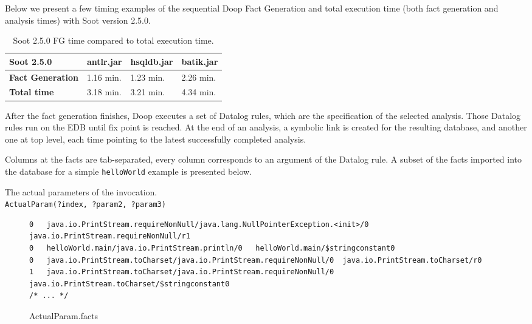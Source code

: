 \documentclass{dithesis}
\begin{document}
        Below we present a few timing examples of the sequential Doop Fact Generation and total execution time (both fact generation and analysis times) with Soot version 2.5.0.
        \begin{table}[H]
            \centering
                \begin{tabular}{llll}
                \hline
                \textbf{Soot 2.5.0}      & \textbf{antlr.jar} & \textbf{hsqldb.jar} & \textbf{batik.jar} \\ \hline
                \textbf{Fact Generation} & 1.16 min.          & 1.23 min.           & 2.26 min.          \\
                \textbf{Total time}      & 3.18 min.          & 3.21 min.           & 4.34 min.          \\ \hline
                \end{tabular}
                \newline
            \caption[Soot 2.5.0 FG times]{Soot 2.5.0 FG time compared to total execution time.}
        \end{table}

    	After the fact generation finishes, Doop executes a set of Datalog rules, which are the specification of the selected analysis. Those Datalog rules run on the EDB until fix point is reached. At the end of an analysis, a symbolic link is created for the resulting database, and another one at top level, each time pointing to the latest successfully completed analysis.

        Columns at the facts are tab-separated, every column corresponds to an argument of the Datalog rule. 
        A subset of the facts imported into the database for a simple \texttt{helloWorld} example is presented below.
        
        The actual parameters of the invocation.\\
        \texttt{ActualParam(?index, ?param2, ?param3)}
    	\begin{figure}[H]
\begin{lstlisting}
0   java.io.PrintStream.requireNonNull/java.lang.NullPointerException.<init>/0  java.io.PrintStream.requireNonNull/r1
0   helloWorld.main/java.io.PrintStream.println/0   helloWorld.main/$stringconstant0
0   java.io.PrintStream.toCharset/java.io.PrintStream.requireNonNull/0  java.io.PrintStream.toCharset/r0
1   java.io.PrintStream.toCharset/java.io.PrintStream.requireNonNull/0  java.io.PrintStream.toCharset/$stringconstant0
/* ... */
\end{lstlisting}
\caption{ActualParam.facts}
        \end{figure}
\end{document}
